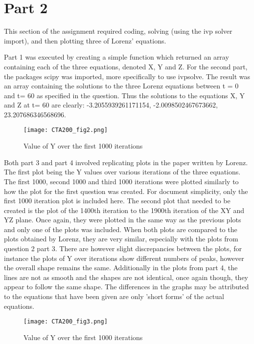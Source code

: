 \documentclass{article}
\begin{document}
\section{Part 2}
This section of the assignment required coding, solving (using the ivp solver import), and then plotting three of Lorenz' equations. 

Part 1 was executed by creating a simple function which returned an array containing each of the three equations, denoted X, Y and Z. For the second part, the packages scipy was imported, more specifically to use ivpsolve. The result was an array containing the solutions to the three Lorenz equations between t = 0 and t= 60 as specified in the question. Thus the solutions to the equations X, Y and Z at t= 60 are clearly: -3.2055939261171154, -2.0098502467673662, 23.207686346568696.


\begin{wrapfigure}{r}{0.5\textwidth}
  \centering
  \texttt{[image: CTA200\_fig2.png]}
  \caption{Value of Y over the first 1000 iterations}
\end{wrapfigure}

Both part 3 and part 4 involved replicating plots in the paper written by Lorenz. The first plot being the Y values over various iterations of the three equations. 
The first 1000, second 1000 and third 1000 iterations were plotted similarly to how the plot for the first question was created. For document simplicity, only the first 1000 iteration plot is included here. 
The second plot that needed to be created is the plot of the 1400th iteration to the 1900th iteration of the XY and YZ plane. 
Once again, they were plotted in the same way as the previous plots and only one of the plots was included. When both plots are compared to the plots obtained by Lorenz, they are very similar, especially with the plots from question 2 part 3. There are however slight discrepancies between the plots, for instance the plots of Y over iterations show different numbers of peaks, however the overall shape remains the same. 
Additionally in the plots from part 4, the lines are not as smooth and the shapes are not identical, once again though, they appear to follow the same shape. The differences in the graphs may be attributed to the equations that have been given are only 'short forms' of the actual equations. 

\begin{wrapfigure}{r}{0.5\textwidth}
  \centering
  \texttt{[image: CTA200\_fig3.png]}
  \caption{Value of Y over the first 1000 iterations}
\end{wrapfigure}
\end{document}
